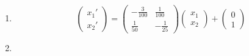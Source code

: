 \documentclass{article}
\begin{document}
\begin{enumerate}
  \item \[\begin{pmatrix}
            x_1' \\
            x_2'
          \end{pmatrix} = \begin{pmatrix}
            -\frac{3}{100} & \frac{1}{100} \\
            \frac{1}{50}   & -\frac{1}{25}
          \end{pmatrix} \begin{pmatrix}
            x_1 \\
            x_2
          \end{pmatrix} + \begin{pmatrix}
            0 \\
            1
          \end{pmatrix}\]

  \item


\end{enumerate}
\end{document}
